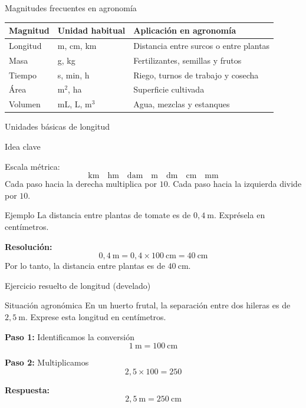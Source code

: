 \documentclass[aspectratio=169,10pt]{beamer}
\newcommand{\idea}[1]{
	\begin{block}{Idea clave}
		#1
	\end{block}
}
\newcommand{\ejemplo}[2]{
	\begin{exampleblock}{Ejemplo}
		#1
		
		\vspace{0.5em}
		\textbf{Resolución:} #2
	\end{exampleblock}
}
\begin{document}
	\begin{frame}{Magnitudes frecuentes en agronomía}
		\small
		\begin{tabular}{>{\raggedright\arraybackslash}p{2.2cm} >{\raggedright\arraybackslash}p{2.2cm} >{\raggedright\arraybackslash}p{6cm}}
			\toprule
			\textbf{Magnitud} & \textbf{Unidad habitual} & \textbf{Aplicación en agronomía} \\
			\midrule
			Longitud & m, cm, km & Distancia entre surcos o entre plantas \\
			\pause
			Masa & g, kg & Fertilizantes, semillas y frutos \\
			\pause
			Tiempo & s, min, h & Riego, turnos de trabajo y cosecha \\
			\pause
			Área & m$^2$, ha & Superficie cultivada \\
			\pause
			Volumen & mL, L, m$^3$ & Agua, mezclas y estanques \\
			\bottomrule
		\end{tabular}
	\end{frame}
	
	\begin{frame}{Unidades básicas de longitud}
		\idea{
			Escala métrica:
			\[
			\text{km}\quad \text{hm}\quad \text{dam}\quad \text{m}\quad \text{dm}\quad \text{cm}\quad \text{mm}
			\]
			Cada paso hacia la derecha multiplica por \(10\).  
			Cada paso hacia la izquierda divide por \(10\).
		}
		
		\pause
		\ejemplo
		{La distancia entre plantas de tomate es de \(0{,}4\ \text{m}\). Exprésela en centímetros.}
		{
			\[
			0{,}4\ \text{m} = 0{,}4 \times 100\ \text{cm} = 40\ \text{cm}
			\]
			Por lo tanto, la distancia entre plantas es de \(\boxed{40\ \text{cm}}\).
		}
	\end{frame}
	
	\begin{frame}{Ejercicio resuelto de longitud (develado)}
		\begin{block}{Situación agronómica}
			En un huerto frutal, la separación entre dos hileras es de \(2{,}5\ \text{m}\).  
			Exprese esta longitud en centímetros.
		\end{block}
		
		\pause
		\textbf{Paso 1:} Identificamos la conversión
		\[
		1\ \text{m} = 100\ \text{cm}
		\]
		
		\pause
		\textbf{Paso 2:} Multiplicamos
		\[
		2{,}5 \times 100 = 250
		\]
		
		\pause
		\textbf{Respuesta:}
		\[
		2{,}5\ \text{m} = \boxed{250\ \text{cm}}
		\]
	\end{frame}
	
\end{document}
